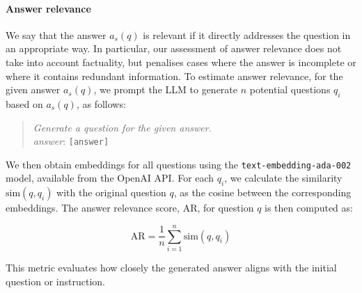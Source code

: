 \documentclass[11pt]{article}
\begin{document}
\paragraph{Answer relevance}
We say that the answer $a_s(q)$ is relevant if it directly addresses the question in an appropriate way. In particular, our assessment of answer relevance does not take into account factuality, but penalises cases where the answer is incomplete or where it contains redundant information. To estimate answer relevance,
for the given answer \( a_s(q) \), we prompt the LLM to generate \( n \) potential questions \( q_i \) based on \( a_s(q) \), as follows:
\begin{quote}
\textit{Generate a question for the given answer.\\
answer}: \texttt{[answer]}
\end{quote}
We then obtain embeddings for all questions using the \texttt{text-embedding-ada-002} model, available from the OpenAI API. For each \( q_i \), we calculate the similarity \( \text{sim}(q, q_i) \) with the original question $q$, as the cosine between the corresponding embeddings.
The answer relevance score, \( \text{AR} \), for question \( q \) is then computed as:

\begin{equation}
\text{AR} = \frac{1}{n} \sum_{i=1}^{n} \text{sim}(q, q_i)
\end{equation}

This metric evaluates how closely the generated answer aligns with the initial question or instruction.
\end{document}
